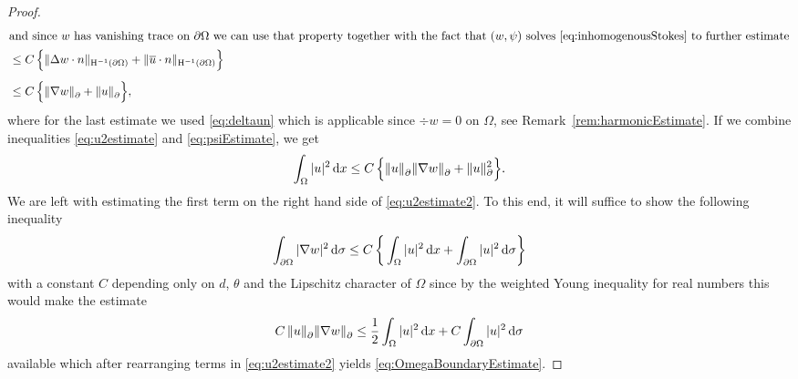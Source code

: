 \begin{proof}
\begin{align}
    \intertext{and since $w$ has vanishing trace on $\partial\Omega$ we can use that property together with the fact that  $(w,\psi)$ solves \eqref{eq:inhomogenousStokes} to further estimate}
    &\leq C \, \Big\{ \| \Delta w \cdot n \|_{\mathrm{H}^{-1}(\partial\Omega)} + \| \overline u \cdot n \|_{\mathrm{H}^{-1}(\partial\Omega)} \Big\} \nonumber\\[0.5em]
    &\leq C \, \Big\{ \|  \nabla w\|^{}_\partial + \|u\|^{}_\partial  \Big\}, \label{eq:psiEstimate}
  \end{align}
  where for the last estimate we used \eqref{eq:deltaun} which is applicable since $\div w = 0$ on $\Omega$, see Remark~\ref{rem:harmonicEstimate}.
  If we combine inequalities \eqref{eq:u2estimate} and \eqref{eq:psiEstimate}, we get
  \begin{align}
    \int_\Omega |u|^2 \, {\operatorname{d}\!{x}} \leq C \, \Big\{ \|u\|^{}_\partial \|\nabla w \|^{}_\partial + \|u\|_\partial^2\Big\}. \label{eq:u2estimate2}
  \end{align}
  We are left with estimating the first term on the right hand side of \eqref{eq:u2estimate2}.
  To this end, it will suffice to show the following inequality
  \begin{align}
    \label{eq:w2estimate}
    \int_{\partial\Omega} |\nabla w|^2 \, {\operatorname{d}\!{\sigma}} \leq C \, \bigg\{ \int_\Omega |u|^2 \, {\operatorname{d}\!{x}} + \int_{\partial\Omega} |u|^2 \, {\operatorname{d}\!{\sigma}} \bigg\}
  \end{align}
  with a constant $C$ depending only on $d$, $\theta$ and the Lipschitz character of $\Omega$ since by the weighted Young inequality for real numbers this would make the estimate
  \begin{align*}
    C \, \| u\|^{}_\partial \|\nabla w\|^{}_\partial \leq \frac{1}{2} \int_\Omega |u|^2 \, {\operatorname{d}\!{x}} + C \int_{\partial\Omega} |u|^2 \, {\operatorname{d}\!{\sigma}}
  \end{align*}
  available which after rearranging terms in \eqref{eq:u2estimate2} yields \eqref{eq:OmegaBoundaryEstimate}.


\end{proof}
